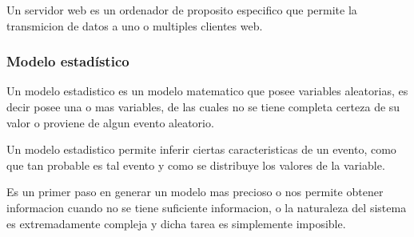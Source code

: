 Un servidor web es un ordenador de proposito especifico que permite la
transmicion de datos a uno o multiples clientes web.

\subsubsection{Modelo estadístico}

Un modelo estadistico es un modelo matematico que posee variables aleatorias,
es decir posee una o mas variables, de las cuales no se tiene completa certeza
de su valor o proviene de algun evento aleatorio.

Un modelo estadistico permite inferir ciertas caracteristicas de un evento,
como que tan probable es tal evento y como se distribuye los valores de la
variable.

Es un primer paso en generar un modelo mas precioso o nos permite obtener
informacion cuando no se tiene suficiente informacion, o la naturaleza del
sistema es extremadamente compleja y dicha tarea es simplemente imposible.
